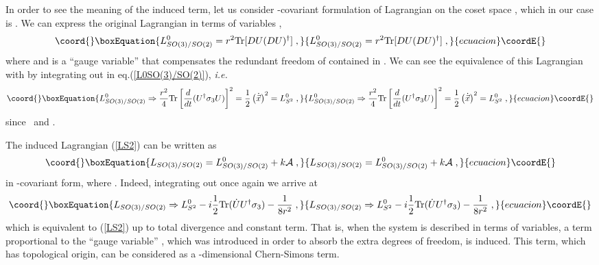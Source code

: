 \documentclass[12pt,a4paper]{article}
\begin{document}
In order to see the meaning of the induced term, let us consider \coordHE{}%
-covariant formulation of Lagrangian on the coset space \coordHE{} , which in our
case is \coordHE{}. We can express the original Lagrangian in terms
of \coordHE{} variables \coordHE{} , 
\begin{equation}\coord{}\boxEquation{
L_{SO(3)/SO(2)}^{0}={r}^{2}\mathrm{Tr}[DU(DU)^{\dagger }]\;,
\label{L0SO(3)/SO(2)}
}{
L_{SO(3)/SO(2)}^{0}={r}^{2}\mathrm{Tr}[DU(DU)^{\dagger }]\;,
}{ecuacion}\coordE{}\end{equation}
where \coordHE{} and \coordHE{} is a ``gauge variable'' that compensates
the redundant freedom of \coordHE{} contained in \coordHE{} . We can see the
equivalence of this Lagrangian with \coordHE{} by integrating out \coordHE{} in eq.(\ref{L0SO(3)/SO(2)}), \textit{i.e.} 
\begin{equation}\coord{}\boxEquation{
L_{SO(3)/SO(2)}^{0}\Rightarrow {\frac{r^{2}}{4}}\mathrm{Tr}\left[ {\frac{d}{
dt}}(U^{\dagger }\sigma _{3}U)\right] ^{2}=\frac{1}{2}\left( \dot{\vec{x}}
\right) ^{2}=L_{S^{2}}^{0}\;,
}{
L_{SO(3)/SO(2)}^{0}\Rightarrow {\frac{r^{2}}{4}}\mathrm{Tr}\left[ {\frac{d}{
dt}}(U^{\dagger }\sigma _{3}U)\right] ^{2}=\frac{1}{2}\left( \dot{\vec{x}}
\right) ^{2}=L_{S^{2}}^{0}\;,
}{ecuacion}\coordE{}\end{equation}
since \coordHE{}\ and \coordHE{}.

The induced Lagrangian (\ref{LS2}) can be written as 
\begin{equation}\coord{}\boxEquation{
L_{SO(3)/SO(2)}=L_{SO(3)/SO(2)}^{0}+k\mathcal{A}\;,
}{
L_{SO(3)/SO(2)}=L_{SO(3)/SO(2)}^{0}+k\mathcal{A}\;,
}{ecuacion}\coordE{}\end{equation}
in \coordHE{}-covariant form, where \coordHE{} . Indeed, integrating out \coordHE{}
once again we arrive at 
\begin{equation}\coord{}\boxEquation{
L_{SO(3)/SO(2)}\Rightarrow L_{S^{2}}^{0}-i\frac{1}{2}\mathrm{Tr}(\dot{U}
U^{\dagger }\sigma _{3})-\frac{1}{8r^{2}}\;,
}{
L_{SO(3)/SO(2)}\Rightarrow L_{S^{2}}^{0}-i\frac{1}{2}\mathrm{Tr}(\dot{U}
U^{\dagger }\sigma _{3})-\frac{1}{8r^{2}}\;,
}{ecuacion}\coordE{}\end{equation}
which is equivalent to \coordHE{} (\ref{LS2}) up to total divergence and
constant term. That is, when the system is described in terms of \coordHE{}
variables, a term proportional to the ``gauge variable'' \coordHE{},
which was introduced in order to absorb the extra degrees of freedom, is
induced. This term, which has topological origin, can be considered as a \coordHE{}-dimensional Chern-Simons term.
\end{document}
